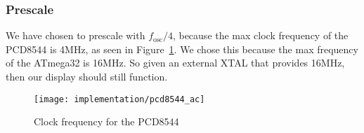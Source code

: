 \subsubsection{Prescale}

We have chosen to prescale with $f_{\text{osc}}/4$, because the max clock frequency of the PCD8544 is 4MHz, as seen in Figure~\ref{fig:pcd8544_ac}. We chose this because the max frequency of the ATmega32 is 16MHz. So given an external XTAL that provides 16MHz, then our display should still function. 

\begin{figure}
	\centering
	\texttt{[image: implementation/pcd8544\_ac]}
	\caption{Clock frequency for the PCD8544\cite[20]{philips:pcd8544}}
	\label{fig:pcd8544_ac}
\end{figure}

